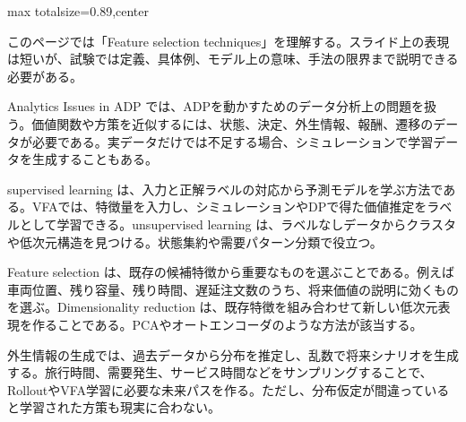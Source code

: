 \begin{minipage}[t]{0.58\textwidth}
\begin{adjustbox}{max totalsize={\textwidth}{0.89\textheight},center}
\begin{minipage}{\textwidth}\scriptsize
{}このページでは「Feature selection techniques」を理解する。スライド上の表現は短いが、試験では定義、具体例、モデル上の意味、手法の限界まで説明できる必要がある。\par
Analytics Issues in ADP では、ADPを動かすためのデータ分析上の問題を扱う。価値関数や方策を近似するには、状態、決定、外生情報、報酬、遷移のデータが必要である。実データだけでは不足する場合、シミュレーションで学習データを生成することもある。\par
supervised learning は、入力と正解ラベルの対応から予測モデルを学ぶ方法である。VFAでは、特徴量を入力し、シミュレーションやDPで得た価値推定をラベルとして学習できる。unsupervised learning は、ラベルなしデータからクラスタや低次元構造を見つける。状態集約や需要パターン分類で役立つ。\par
Feature selection は、既存の候補特徴から重要なものを選ぶことである。例えば車両位置、残り容量、残り時間、遅延注文数のうち、将来価値の説明に効くものを選ぶ。Dimensionality reduction は、既存特徴を組み合わせて新しい低次元表現を作ることである。PCAやオートエンコーダのような方法が該当する。\par
外生情報の生成では、過去データから分布を推定し、乱数で将来シナリオを生成する。旅行時間、需要発生、サービス時間などをサンプリングすることで、RolloutやVFA学習に必要な未来パスを作る。ただし、分布仮定が間違っていると学習された方策も現実に合わない。\par

\end{minipage}
\end{adjustbox}
\end{minipage}
